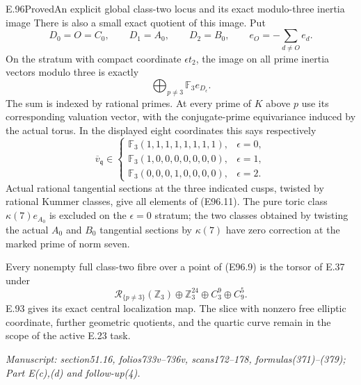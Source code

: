\begin{statement}{E.96}{Proved}{An explicit global class-two locus and its exact modulo-three inertia image}
There is also a small exact quotient of this image. Put
\[
 D_0=O=C_0,\qquad D_1=A_0,\qquad D_2=B_0,\qquad
 e_O=-\sum_{d\ne O}e_d.
 \tag{E96.10}
\]
On the stratum with compact coordinate $\epsilon t_2$,
the image on all prime inertia vectors modulo three is
exactly
\[
 \bigoplus_{p\ne3}\mathbb F_3e_{D_\epsilon}.
 \tag{E96.11}
\]
The sum is indexed by rational primes. At every prime of $K$
above $p$ use its corresponding valuation vector, with the
conjugate-prime equivariance induced by the actual torus.
In the displayed eight coordinates this says respectively
\[
 \overline v_{\mathfrak q}\in
 \begin{cases}
   \mathbb F_3(1,1,1,1,1,1,1,1),&\epsilon=0,\\
   \mathbb F_3(1,0,0,0,0,0,0,0),&\epsilon=1,\\
   \mathbb F_3(0,0,0,1,0,0,0,0),&\epsilon=2.
 \end{cases}
 \tag{E96.12}
\]
Actual rational tangential sections at the three indicated
cusps, twisted by rational Kummer classes, give all elements
of (E96.11). The pure toric class $\kappa(7)e_{A_0}$ is
excluded on the $\epsilon=0$ stratum; the two classes obtained
by twisting the actual $A_0$ and $B_0$ tangential sections by
$\kappa(7)$ have zero correction at the marked prime of norm seven.

Every nonempty full class-two fibre over a point of (E96.9)
is the torsor of E.37 under
\[
 \mathcal R_{\{p\ne3\}}(\mathbb Z_3)
       \oplus\mathbb Z_3^{24}\oplus C_3^9\oplus C_9^5.
 \tag{E96.13}
\]
E.93 gives its exact central localization map. The slice
with nonzero free elliptic coordinate, further geometric
quotients, and the quartic curve remain in the scope of
the active E.23 task.

\emph{Manuscript: section51.16, folios733v--736v,
scans172--178, formulas(371)--(379); Part E(c),(d)
and follow-up(4).}
\end{statement}
